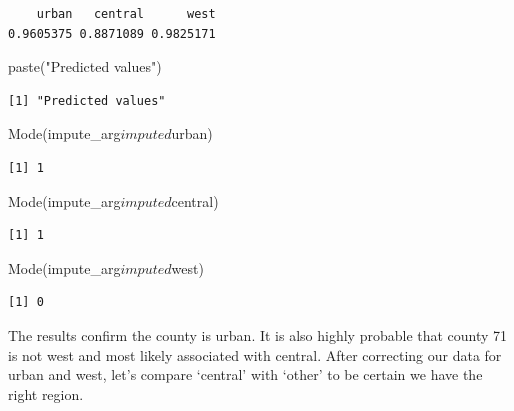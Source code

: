 \documentclass[]{article}
\newenvironment{Shaded}{}{}
\newcommand{\KeywordTok}[1]{\textcolor[rgb]{0.00,0.00,1.00}{#1}}
\newcommand{\NormalTok}[1]{#1}
\newcommand{\OperatorTok}[1]{#1}
\newcommand{\StringTok}[1]{\textcolor[rgb]{0.00,0.50,0.50}{#1}}
\begin{document}
\begin{verbatim}
    urban   central      west 
0.9605375 0.8871089 0.9825171 
\end{verbatim}

\begin{Shaded}
\begin{Highlighting}[]
\KeywordTok{paste}\NormalTok{(}\StringTok{"Predicted values"}\NormalTok{)}
\end{Highlighting}
\end{Shaded}

\begin{verbatim}
[1] "Predicted values"
\end{verbatim}

\begin{Shaded}
\begin{Highlighting}[]
\KeywordTok{Mode}\NormalTok{(impute_arg}\OperatorTok{$}\NormalTok{imputed}\OperatorTok{$}\NormalTok{urban)}
\end{Highlighting}
\end{Shaded}

\begin{verbatim}
[1] 1
\end{verbatim}

\begin{Shaded}
\begin{Highlighting}[]
\KeywordTok{Mode}\NormalTok{(impute_arg}\OperatorTok{$}\NormalTok{imputed}\OperatorTok{$}\NormalTok{central)}
\end{Highlighting}
\end{Shaded}

\begin{verbatim}
[1] 1
\end{verbatim}

\begin{Shaded}
\begin{Highlighting}[]
\KeywordTok{Mode}\NormalTok{(impute_arg}\OperatorTok{$}\NormalTok{imputed}\OperatorTok{$}\NormalTok{west)}
\end{Highlighting}
\end{Shaded}

\begin{verbatim}
[1] 0
\end{verbatim}

The results confirm the county is urban. It is also highly probable that
county 71 is not west and most likely associated with central. After
correcting our data for urban and west, let's compare `central' with
`other' to be certain we have the right region.
\end{document}
